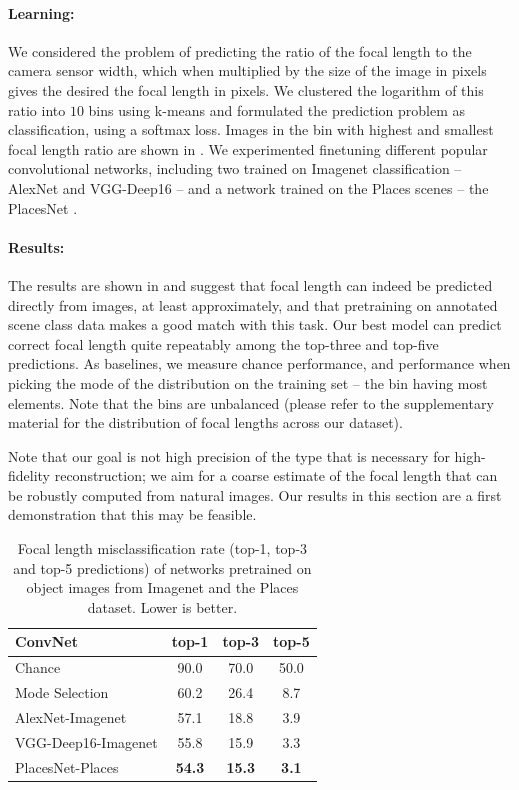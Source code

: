 \paragraph{Learning:} We considered the problem of predicting the ratio of the focal length to the camera sensor width, which when multiplied by the size of the image in pixels gives the desired the focal length in pixels. We clustered the logarithm of this ratio into $10$ bins using k-means and formulated the prediction problem as classification, using a softmax loss. Images in the bin with highest and smallest focal length ratio are shown in . We experimented finetuning different popular convolutional networks, including two trained on Imagenet classification -- AlexNet \cite{krizhevsky2012imagenet} and VGG-Deep16 \cite{simonyan2014very} -- and a network trained on the Places scenes -- the PlacesNet \cite{zhou2014learning}.

\paragraph{Results:} The results are shown in  and suggest that focal length can indeed be predicted directly from images, at least approximately, and that pretraining on annotated scene class data makes a good match with this task. Our best model can predict correct focal length quite repeatably  among the top-three and top-five predictions. As baselines, we measure chance performance, and performance when picking the mode of the distribution on the training set -- the bin having most elements. Note that the bins are unbalanced (please refer to the supplementary material for the distribution of focal lengths across our dataset).

Note that our goal is not high precision of the type that is necessary for high-fidelity reconstruction; we aim for a coarse estimate of the focal length that can be robustly computed from natural images. Our results in this section are a first demonstration that this may be feasible.

\begin{table}
\centering
 \begin{tabular}{ l  c  c c}
\toprule
\textbf{ConvNet} & \textbf{top-1} & \textbf{top-3} & \textbf{top-5} \\
\midrule
Chance & 90.0 & 70.0 & 50.0 \\
Mode Selection & 60.2 & 26.4 & 8.7 \\
\midrule
AlexNet-Imagenet & 57.1  & 18.8 & 3.9 \\
VGG-Deep16-Imagenet & 55.8 & 15.9 & 3.3 \\
PlacesNet-Places & \textbf{54.3} & \textbf{15.3} & \textbf{3.1} \\
\bottomrule
  \end{tabular}
    \caption{Focal length misclassification rate (top-1, top-3 and top-5 predictions) of networks pretrained on object images from Imagenet and the Places dataset. Lower is better.}
\end{table}




